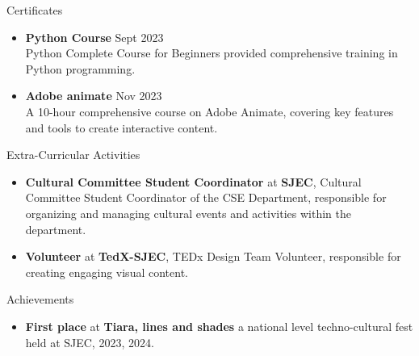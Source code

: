 \documentclass{resume} %
\begin{document}
\begin{rSection}{Certificates} 
    \begin{itemize}
        \item \textbf{Python Course} \hfill Sept 2023\\
        Python Complete Course for Beginners provided comprehensive training in Python programming.
        \item \textbf{Adobe animate} \hfill Nov 2023\\
        A 10-hour comprehensive course on Adobe Animate, covering key features and tools to create interactive content.
    \end{itemize}
    
    
    \end{rSection}
    \begin{rSection}{Extra-Curricular Activities} 
\begin{itemize}
    \item 	\textbf{Cultural Committee Student Coordinator} at \textbf{SJEC}, Cultural Committee Student Coordinator of the CSE Department, responsible for organizing and managing cultural events and activities within the department.
    \item	\textbf{Volunteer} at \textbf{TedX-SJEC}, TEDx Design Team Volunteer, responsible for creating engaging visual content.

\end{itemize}


\end{rSection}

\begin{rSection}{Achievements} 
    \begin{itemize}
        \item 	\textbf{First place} at \textbf{Tiara, lines and shades} 
 a national level techno-cultural fest held at SJEC, 2023, 2024.
    
    \end{itemize}
    
    
    \end{rSection}
\end{document}
